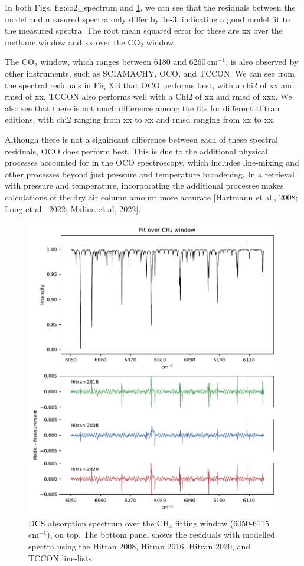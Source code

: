\documentclass[amt, manuscript]{copernicus}
\begin{document}
In both Figs. {fig:co2_spectrum} and \ref{fig:ch4_spectrum}, we can see that the residuals between the model and measured spectra only differ by 1e-3, indicating a good model fit to the measured spectra. The root mean squared error for these are xx over the methane window and xx over the CO$_2$ window.

The CO$_2$ window, which ranges between 6180 and 6260\,cm$^{-1}$, is also observed by other instruments, such as SCIAMACHY, OCO, and TCCON. We can see from the spectral residuals in Fig XB that OCO performs best, with a chi2 of xx and rmsd of xx. TCCON also performs well with a Chi2 of xx and rmsd of xxx. We also see that there is not much difference among the fits for different Hitran editions, with chi2 ranging from xx to xx and rmsd ranging from xx to xx.

Although there is not a significant difference between each of these spectral residuals, OCO does perform best. This is due to the additional physical processes accounted for in the OCO spectroscopy, which includes line-mixing and other processes beyond just pressure and temperature broadening. In a retrieval with pressure and temperature, incorporating the additional processes makes calculations of the dry air column amount more accurate [Hartmann et al., 2008; Long et al., 2022; Malina et al, 2022].

\begin{figure}
  \centering
  \includegraphics{ch4_fit.pdf}
  \caption{DCS absorption spectrum over the CH$_4$ fitting window (6050-6115\,cm$^{-1}$), on top. The bottom panel shows the residuals with modelled spectra using the Hitran 2008, Hitran 2016, Hitran 2020, and TCCON line-lists.}
  \label{fig:ch4_spectrum}
\end{figure}
\end{document}
